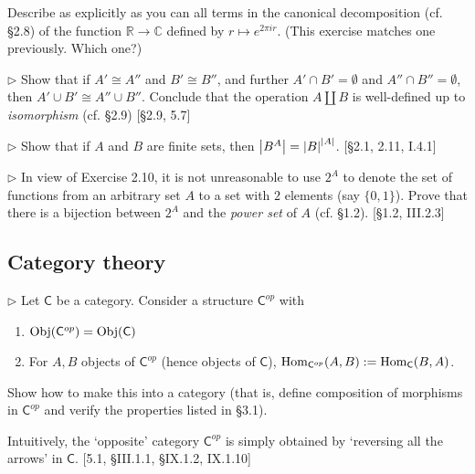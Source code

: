 \begin{problem}
  Describe as explicitly as you can all terms in the canonical decomposition
  (cf. \S2.8) of the function $\mathbb{R}\to\mathbb{C}$ defined by $r\mapsto
  e^{2\pi ir}$. (This exercise matches one previously. Which one?)
\end{problem}

\begin{problem}
  $\rhd$ Show that if $A'\cong A''$ and $B'\cong B''$, and further
  $A'\cap B'=\emptyset$ and $A''\cap B''=\emptyset$, then
  $A'\cup B'\cong A''\cup B''$. Conclude that the operation $A\amalg B$
  is well-defined up to \textit{isomorphism} (cf. \S2.9) [\S2.9, 5.7]
\end{problem}

\begin{problem}
  $\rhd$ Show that if $A$ and $B$ are finite sets, then $\left|B^A\right| =
  \left|B\right|^{\left|A\right|}$. [\S2.1, 2.11, I.4.1]
\end{problem}

\begin{problem}
  $\rhd$ In view of Exercise 2.10, it is not unreasonable to use $2^A$ to
  denote the set of functions from an arbitrary set $A$ to a set with $2$
  elements (say $\{0,1\}$). Prove that there is a bijection between $2^A$
  and the \textit{power set} of $A$ (cf. \S1.2). [\S1.2, III.2.3]
\end{problem}

\subsection{Category theory}


\begin{problem}
  $\rhd$ Let $\mathsf{C}$ be a category. Consider a structure
  $\mathsf{C}^{op}$ with
  \begin{enumerate}
    \item $\mathrm{Obj}(\mathsf{C}^{op}) = \mathrm{Obj}(\mathsf{C})$
    \item For $A, B$ objects of $\mathsf{C}^{op}$ (hence objects of
    $\mathsf{C}$), $\mathrm{Hom}_{\mathsf{C}^{op}}(A, B) := \mathrm{Hom}_{\mathsf{C}}(B, A)$.
  \end{enumerate}
  Show how to make this into a category (that is, define composition of
  morphisms in $\mathsf{C}^{op}$ and verify the properties listed in \S3.1).

  Intuitively, the `opposite' category $\mathsf{C}^{op}$ is simply obtained
  by `reversing all the arrows' in $\mathsf{C}$. [5.1, \S III.1.1, \S IX.1.2,
  IX.1.10]
\end{problem}

